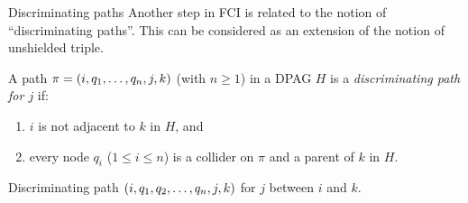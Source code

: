 \begin{frame}{Discriminating paths}
Another step in FCI is related to the notion of ``discriminating paths''.
This can be considered as an extension of the notion of unshielded triple.

\begin{Def}[\ref{def:discriminating_path}]
  A path $\pi = \left ( i, q_1, \dots, q_n, j, k\right )$ (with $n \ge 1$) in a DPAG $H$ is
  a \emph{discriminating path for $j$} if:
  \begin{enumerate}
    \item $i$ is not adjacent to $k$ in $H$, and
    \item every node $q_i$ ($1 \le i \le n$) is a collider on $\pi$ and a parent of $k$ in $H$.
  \end{enumerate}
\end{Def}

\begin{center}
\end{center}
\vspace{-5mm}
Discriminating path $\left ( i,q_1,q_2,\dots,q_n,j,k \right )$ for $j$ between $i$ and $k$.
\end{frame}

